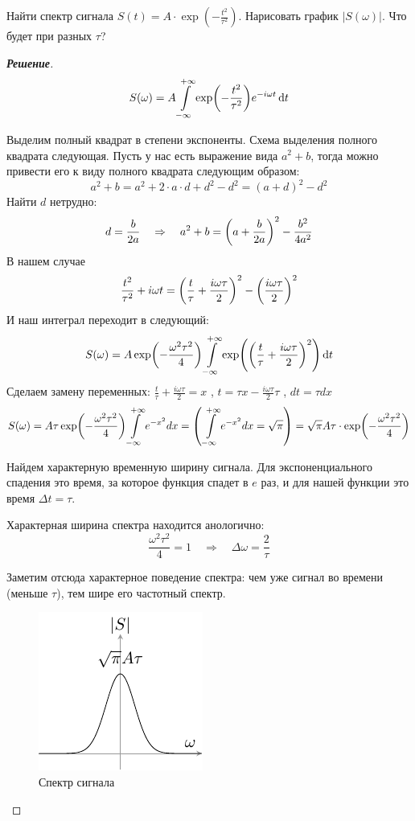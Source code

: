 \begin{task}
	Найти спектр сигнала $S(t)=A\cdot \exp(-\frac{t^2}{\tau^2})$. Нарисовать график $|S(\omega)|$. Что будет при разных $\tau$?
\end{task}
\begin{proof}[\rm{\textbf{Решение}}]

\begin{equation}
	S(\omega)=A\int\limits_{-\infty}^{+\infty} \exp(-\frac{t^2}{\tau^2})e^{-i\omega t}\dd{t}
\end{equation}

Выделим полный квадрат в степени экспоненты. Схема выделения полного квадрата следующая. Пусть у нас есть выражение вида $a^2+b$, тогда можно привести его к виду полного квадрата следующим образом:
\begin{equation}
	a^2+b=a^2+2\cdot a \cdot d + d^2-d^2 = (a+d)^2-d^2
\end{equation}
Найти $d$ нетрудно: 
\begin{equation}
	d=\frac{b}{2a} \quad \Rightarrow \quad 
		a^2+b=\qty(a+\frac{b}{2a})^2-\frac{b^2}{4a^2}
\end{equation}
В нашем случае
\begin{equation}
	\frac{t^2}{\tau^2}+i\omega t=\qty(\frac{t}{\tau}+\frac{i\omega \tau}{2})^2-\qty(\frac{i\omega \tau}{2})^2
\end{equation}
И наш интеграл переходит в следующий:
\begin{equation}
	S(\omega)=A\exp(-\frac{\omega^2 \tau^2}{4})\int\limits_{-\infty}^{+\infty} \exp(\qty(\frac{t}{\tau}+\frac{i\omega \tau}{2})^2) \dd{t}
\end{equation}
Сделаем замену переменных: $\frac{t}{\tau}+\frac{i\omega \tau}{2} = x$ , $t=\tau x-\frac{i\omega \tau}{2}\tau$ , $dt=\tau dx$
\begin{equation}
	S(\omega)=A\tau \exp(-\frac{\omega^2 \tau^2}{4}) \int\limits_{-\infty}^{+\infty} e^{-x^2}dx
	=\qty(\,\int\limits_{-\infty}^{+\infty} e^{-x^2} dx=\sqrt\pi)=\sqrt\pi A\tau\cdot \exp(-\frac{\omega^2 \tau^2}{4})
\end{equation}

Найдем характерную временную ширину сигнала. Для экспоненциального спадения это время, за которое функция спадет в $e$ раз, и для нашей функции это время $\Delta t=\tau$.

Характерная ширина спектра находится анологично:
\begin{equation}
	\frac{\omega^2 \tau^2}{4}=1 \quad \Rightarrow \quad
		\Delta \omega=\frac{2}{\tau}
\end{equation}

Заметим отсюда характерное поведение спектра: чем уже сигнал во времени (меньше $\tau$), тем шире его частотный спектр.

\begin{figure}[h!]
	\centering
	\includegraphics[scale=2.2]{ris/task1_out}
	\caption{Спектр сигнала}
\end{figure}
\end{proof}